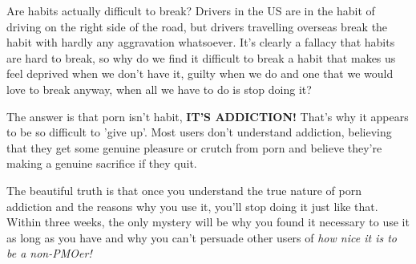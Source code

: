 \documentclass[easypeasy.tex]{subfiles}
\begin{document}
Are habits actually difficult to break? Drivers in the US are in the habit of driving on the right side of the road, but drivers travelling overseas break the habit with hardly any aggravation whatsoever. It's clearly a fallacy that habits are hard to break, so why do we find it difficult to break a habit that makes us feel deprived when we don't have it, guilty when we do and one that we would love to break anyway, when all we have to do is stop doing it?

The answer is that porn isn't habit, \textbf{IT'S ADDICTION!} That's why it appears to be so difficult to 'give up'. Most users don't understand addiction, believing that they get some genuine pleasure or crutch from porn and believe they're making a genuine sacrifice if they quit.

The beautiful truth is that once you understand the true nature of porn addiction and the reasons why you use it, you'll stop doing it just like that. Within three weeks, the only mystery will be why you found it necessary to use it as long as you have and why you can't persuade other users of \textit{how nice it is to be a non-PMOer!}
\end{document}
